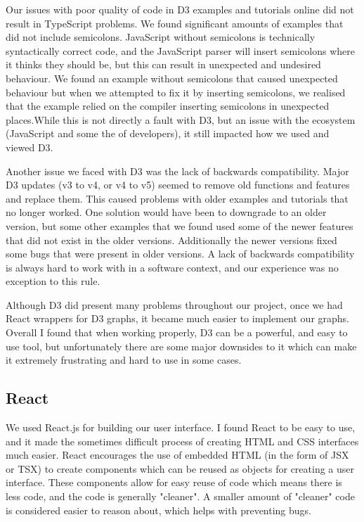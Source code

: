 \documentclass[10pt, journal]{IEEEtran}
\begin{document}
Our issues with poor quality of code in D3 examples and tutorials online did not result in TypeScript problems. We found significant amounts of examples that did not include semicolons. JavaScript without semicolons is technically syntactically correct code, and the JavaScript parser will insert semicolons where it thinks they should be, but this can result in unexpected and undesired behaviour. We found an example without semicolons that caused unexpected behaviour but when we attempted to fix it by inserting semicolons, we realised that the example relied on the compiler inserting semicolons in unexpected places.While this is not directly a fault with D3, but an issue with the ecosystem (JavaScript and some the of developers), it still impacted how we used and viewed D3. 

Another issue we faced with D3 was the lack of backwards compatibility. Major D3 updates (v3 to v4, or v4 to v5) seemed to remove old functions and features and replace them. This caused problems with older examples and tutorials that no longer worked. One solution would have been to downgrade to an older version, but some other examples that we found used some of the newer features that did not exist in the older versions. Additionally the newer versions fixed some bugs that were present in older versions. A lack of backwards compatibility is always hard to work with in a software context, and our experience was no exception to this rule.

Although D3 did present many problems throughout our project, once we had React wrappers for D3 graphs, it became much easier to implement our graphs. Overall I found that when working properly, D3 can be a powerful, and easy to use tool, but unfortunately there are some major downsides to it which can make it extremely frustrating and hard to use in some cases. 

\subsection{React}
We used React.js \cite{react} for building our user interface. I found React to be easy to use, and it made the sometimes difficult process of creating HTML and CSS interfaces much easier. React encourages the use of embedded HTML (in the form of JSX or TSX) to create components which can be reused as objects for creating a user interface. These components allow for easy reuse of code which means there is less code, and the code is generally "cleaner". A smaller amount of "cleaner" code is considered easier to reason about, which helps with preventing bugs. 
\end{document}
